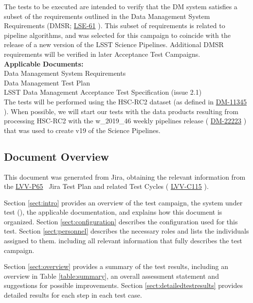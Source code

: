 \documentclass[DM,STR,toc]{lsstdoc}
\begin{document}
 The tests to be executed are intended to verify that the DM system
satisfies a subset of the requirements outlined in the Data Management
System Requirements (DMSR; \href{https://lse-61.lsst.io/}{LSE-61} ).
This subset of requirements is related to pipeline algorithms, and was
selected for this campaign to coincide with the release of a new version
of the LSST Science Pipelines. Additional DMSR requirements will be
verified in later Acceptance Test
Campaigns.\\[2\baselineskip]\textbf{Applicable
Documents:}\\[2\baselineskip] Data Management System
Requirements\\
 Data Management Test Plan\\
 LSST Data Management Acceptance Test Specification (issue
2.1)\\[2\baselineskip]The tests will be performed using the HSC-RC2
dataset (as defined in
\href{https://jira.lsstcorp.org/browse/DM-11345}{DM-11345} ). When
possible, we will start our tests with the data products resulting from
processing HSC-RC2 with the w\_2019\_46 weekly pipelines release (
\href{https://jira.lsstcorp.org/browse/DM-22223}{DM-22223} ) that was
used to create v19 of the Science Pipelines.~


\subsection{Document Overview}
\label{sect:docoverview}

This document was generated from Jira, obtaining the relevant information from the 
\href{https://jira.lsstcorp.org/secure/Tests.jspa#/testPlan/LVV-P65}{LVV-P65}
~Jira Test Plan and related Test Cycles (
  \href{https://jira.lsstcorp.org/secure/Tests.jspa#/testCycle/LVV-C115}{LVV-C115}
).

Section \ref{sect:intro} provides an overview of the test campaign, the system under test (\product{}),
the applicable documentation, and explains how this document is organized.
Section \ref{sect:configuration}  describes the configuration used for this test.
Section \ref{sect:personnel} describes the necessary roles and lists the individuals assigned to them.
including all relevant information that fully describes the test campaign.

Section \ref{sect:overview} provides a summary of the test results, including an overview in Table \ref{table:summary},
an overall assessment statement and suggestions for possible improvements.
Section \ref{sect:detailedtestresults} provides detailed results for each step in each test case.
\end{document}
